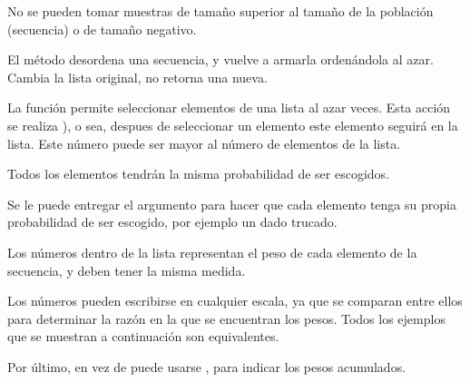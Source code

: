 
No se pueden tomar muestras de tamaño superior al tamaño de la población (secuencia) o de tamaño negativo.



El método  desordena una secuencia, y vuelve a armarla ordenándola al azar.
Cambia la lista original, no retorna una nueva.



La función  permite seleccionar elementos de una lista al azar  veces.
Esta acción se realiza ), o sea, despues de seleccionar un elemento este elemento seguirá en la lista.
Este número puede ser mayor al número de elementos de la lista.


Todos los elementos tendrán la misma probabilidad de ser escogidos.
\medskip

Se le puede entregar el argumento  para hacer que cada elemento tenga su propia probabilidad de ser escogido, por ejemplo un dado trucado.


Los números dentro de la lista  representan el peso de cada elemento de la secuencia, y deben tener la misma medida.
\medskip

Los números pueden escribirse en cualquier escala, ya que se comparan entre ellos para determinar la razón en la que se encuentran los pesos.
Todos los ejemplos que se muestran a continuación son equivalentes.


Por último, en vez de  puede usarse , para indicar los pesos acumulados.


